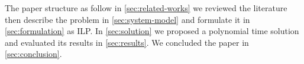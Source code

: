 The paper structure as follow in \ref{sec:related-works} we reviewed the literature then describe the problem in \ref{sec:system-model} and formulate it in \ref{sec:formulation} as ILP. In \ref{sec:solution} we proposed a polynomial time solution and evaluated its results in \ref{sec:results}. We concluded the paper in \ref{sec:conclusion}.